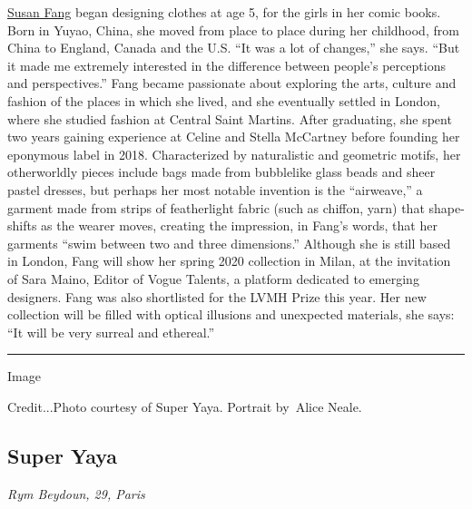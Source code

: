 \href{https://www.susanfangofficial.com/}{Susan Fang} began designing
clothes at age 5, for the girls in her comic books. Born in Yuyao,
China, she moved from place to place during her childhood, from China to
England, Canada and the U.S. ``It was a lot of changes,'' she says.
``But it made me extremely interested in the difference between people's
perceptions and perspectives.'' Fang became passionate about exploring
the arts, culture and fashion of the places in which she lived, and she
eventually settled in London, where she studied fashion at Central Saint
Martins. After graduating, she spent two years gaining experience at
Celine and Stella McCartney before founding her eponymous label in 2018.
Characterized by naturalistic and geometric motifs, her otherworldly
pieces include bags made from bubblelike glass beads and sheer pastel
dresses, but perhaps her most notable invention is the ``airweave,'' a
garment made from strips of featherlight fabric (such as chiffon, yarn)
that shape-shifts as the wearer moves, creating the impression, in
Fang's words, that her garments ``swim between two and three
dimensions.'' Although she is still based in London, Fang will show her
spring 2020 collection in Milan, at the invitation of Sara Maino, Editor
of Vogue Talents, a platform dedicated to emerging designers. Fang was
also shortlisted for the LVMH Prize this year. Her new collection will
be filled with optical illusions and unexpected materials, she says:
``It will be very surreal and ethereal.''

\begin{center}\rule{0.5\linewidth}{\linethickness}\end{center}

Image

Credit...Photo courtesy of Super Yaya. Portrait by~Alice Neale.

\hypertarget{super-yaya}{%
\subsection{Super Yaya}\label{super-yaya}}

\emph{Rym Beydoun, 29, Paris}


